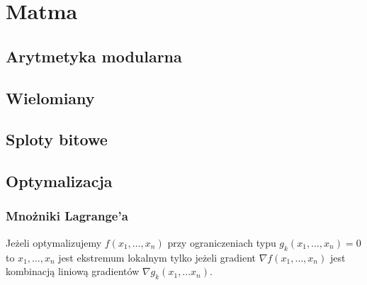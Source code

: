 \section{Matma}

\subsection{Arytmetyka modularna}

\subsection{Wielomiany}

\subsection{Sploty bitowe}

\subsection{Optymalizacja}
\subsubsection{Mnożniki Lagrange'a}
Jeżeli optymalizujemy $f(x_1, \dots, x_n)$ przy ograniczeniach typu $g_k(x_1, \dots, x_n) = 0$ to
$x_1, \dots, x_n$ jest ekstremum lokalnym tylko jeżeli gradient $\nabla f(x_1, \dots, x_n)$ jest
kombinacją liniową gradientów $\nabla g_k(x_1, \dots x_n)$.
